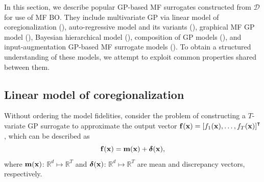 \documentclass[journal ]{new-aiaa}
\begin{document}
	In this section, we describe popular GP-based MF surrogates constructed from $\mathcal{D}$ for use of MF BO.
	They include multivariate GP via linear model of coregionalization (), auto-regressive model and its variants (), graphical MF GP model (), Bayesian hierarchical model (), composition of GP models (), and input-augmentation GP-based MF surrogate models ().
	To obtain a structured understanding of these models, we attempt to exploit common properties shared between them.
	
	\subsection{Linear model of coregionalization}\label{Sec41}
	
	Without ordering the model fidelities, consider the problem of constructing a $T$-variate GP surrogate to approximate the output vector ${\bf f}({\bf x})=\left[f_1({\bf x}),\dots,f_T({\bf x})\right]^\intercal$, which can be described as
	\begin{equation}\label{eqn4}
		{\bf f}({\bf x}) = {\bf m}({\bf x}) + {\boldsymbol \delta}({\bf x}),
	\end{equation}
	where ${\bf m}({\bf x})$: $\mathbb{R}^d \mapsto \mathbb{R}^T$  and ${\boldsymbol \delta}({\bf x})$: $\mathbb{R}^d \mapsto \mathbb{R}^T$ are mean and discrepancy vectors, respectively.
	
\end{document}
